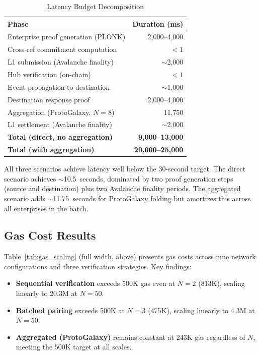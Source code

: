\documentclass[conference]{IEEEtran}
\begin{document}
\begin{table}[t]
  \centering
  \caption{Latency Budget Decomposition}
  \label{tab:latency_budget}
  \begin{tabular}{@{}lr@{}}
    \toprule
    \textbf{Phase} & \textbf{Duration (ms)} \\
    \midrule
    Enterprise proof generation (PLONK) & 2,000--4,000 \\
    Cross-ref commitment computation & $< 1$ \\
    L1 submission (Avalanche finality) & $\sim$2,000 \\
    Hub verification (on-chain) & $< 1$ \\
    Event propagation to destination & $\sim$1,000 \\
    Destination response proof & 2,000--4,000 \\
    Aggregation (ProtoGalaxy, $N{=}8$) & 11,750 \\
    L1 settlement (Avalanche finality) & $\sim$2,000 \\
    \midrule
    \textbf{Total (direct, no aggregation)} & \textbf{9,000--13,000} \\
    \textbf{Total (with aggregation)} & \textbf{20,000--25,000} \\
    \bottomrule
  \end{tabular}
\end{table}

All three scenarios achieve latency well below the 30-second target. The
direct scenario achieves $\sim$10.5~seconds, dominated by two proof
generation steps (source and destination) plus two Avalanche finality
periods. The aggregated scenario adds $\sim$11.75~seconds for ProtoGalaxy
folding but amortizes this across all enterprises in the batch.

\subsection{Gas Cost Results}

Table~\ref{tab:gas_scaling} (full width, above) presents gas costs across
nine network configurations and three verification strategies. Key findings:

\begin{itemize}
  \item \textbf{Sequential verification} exceeds 500K gas even at $N{=}2$
        (813K), scaling linearly to 20.3M at $N{=}50$.
  \item \textbf{Batched pairing} exceeds 500K at $N{=}3$ (475K), scaling
        linearly to 4.3M at $N{=}50$.
  \item \textbf{Aggregated (ProtoGalaxy)} remains constant at 243K gas
        regardless of $N$, meeting the 500K target at all scales.
\end{itemize}
\end{document}
